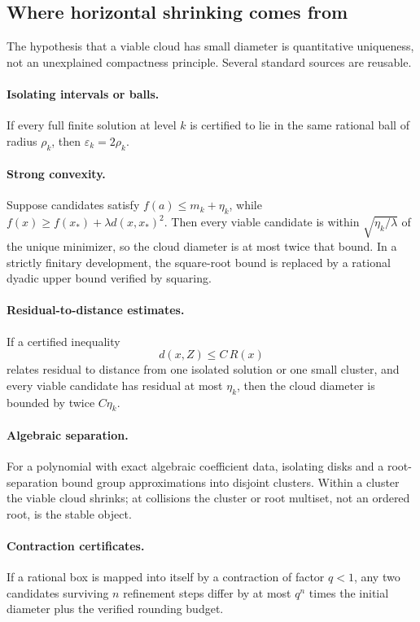 \subsection{Where horizontal shrinking comes from}

The hypothesis that a viable cloud has small diameter is quantitative
uniqueness, not an unexplained compactness principle.  Several standard
sources are reusable.

\paragraph{Isolating intervals or balls.}
If every full finite solution at level \(k\) is certified to lie in the same
rational ball of radius \(\rho_k\), then
\(\varepsilon_k=2\rho_k\).

\paragraph{Strong convexity.}
Suppose candidates satisfy
\(f(a)\le m_k+\eta_k\), while
\(f(x)\ge f(x_*)+\lambda d(x,x_*)^2\).  Then every viable candidate is within
\(\sqrt{\eta_k/\lambda}\) of the unique minimizer, so the cloud diameter is at
most twice that bound.  In a strictly finitary development, the square-root
bound is replaced by a rational dyadic upper bound verified by squaring.

\paragraph{Residual-to-distance estimates.}
If a certified inequality
\[
 d(x,Z)\le C\,R(x)
\]
relates residual to distance from one isolated solution or one small cluster,
and every viable candidate has residual at most \(\eta_k\), then the cloud
diameter is bounded by twice \(C\eta_k\).

\paragraph{Algebraic separation.}
For a polynomial with exact algebraic coefficient data, isolating disks and a
root-separation bound group approximations into disjoint clusters.  Within a
cluster the viable cloud shrinks; at collisions the cluster or root multiset,
not an ordered root, is the stable object.

\paragraph{Contraction certificates.}
If a rational box is mapped into itself by a contraction of factor
\(q<1\), any two candidates surviving \(n\) refinement steps differ by at
most \(q^n\) times the initial diameter plus the verified rounding budget.


